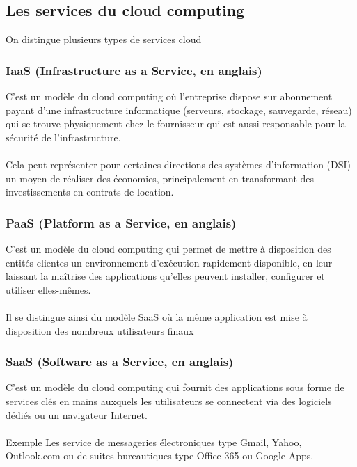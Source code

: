 \subsection{Les services du cloud computing} On distingue plusieurs types de services cloud \\
\subsubsection{IaaS (Infrastructure as a Service, en anglais) }
C'est un modèle du cloud computing où l'entreprise dispose sur abonnement payant d'une infrastructure informatique (serveurs, stockage, sauvegarde, réseau) qui se trouve physiquement chez le fournisseur qui est aussi responsable pour la sécurité de l'infrastructure.\\ \\Cela peut représenter pour certaines directions des systèmes d’information (DSI) un moyen de réaliser des économies, principalement en transformant des investissements en contrats de location.

\subsubsection{PaaS (Platform as a Service, en anglais)}
C'est un  modèle du cloud computing qui permet de mettre à disposition des entités clientes un environnement d'exécution rapidement disponible, en leur laissant la maîtrise des applications qu'elles peuvent installer, configurer et utiliser elles-mêmes.\\ \\ Il se distingue ainsi du modèle SaaS où la même application est mise à disposition des nombreux utilisateurs finaux
\subsubsection{SaaS (Software as a Service, en anglais)}
C'est un modèle du cloud computing qui fournit des applications  sous forme de services clés en mains auxquels les utilisateurs se connectent via des logiciels dédiés ou un navigateur Internet. \\ \\Exemple Les service de messageries électroniques type Gmail, Yahoo, Outlook.com ou de suites bureautiques type Office 365 ou Google Apps.
\newpage
